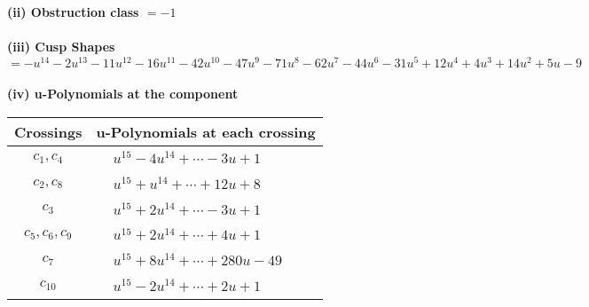 \documentclass[1p]{elsarticle_modified}
\theoremstyle{definition}
\begin{document}
\flushleft \textbf{(ii) Obstruction class $= -1$}\\~\\
\flushleft \textbf{(iii) Cusp Shapes $= - u^{14}-2 u^{13}-11 u^{12}-16 u^{11}-42 u^{10}-47 u^9-71 u^8-62 u^7-44 u^6-31 u^5+12 u^4+4 u^3+14 u^2+5 u-9$}\\~\\
\newpage\renewcommand{\arraystretch}{1}
\flushleft \textbf{(iv) u-Polynomials at the component}\newline \\
\begin{tabular}{m{50pt}|m{274pt}}
Crossings & \hspace{64pt}u-Polynomials at each crossing \\
\hline $$\begin{aligned}c_{1},c_{4}\end{aligned}$$&$\begin{aligned}
&u^{15}-4 u^{14}+\cdots-3 u+1
\end{aligned}$\\
\hline $$\begin{aligned}c_{2},c_{8}\end{aligned}$$&$\begin{aligned}
&u^{15}+u^{14}+\cdots+12 u+8
\end{aligned}$\\
\hline $$\begin{aligned}c_{3}\end{aligned}$$&$\begin{aligned}
&u^{15}+2 u^{14}+\cdots-3 u+1
\end{aligned}$\\
\hline $$\begin{aligned}c_{5},c_{6},c_{9}\end{aligned}$$&$\begin{aligned}
&u^{15}+2 u^{14}+\cdots+4 u+1
\end{aligned}$\\
\hline $$\begin{aligned}c_{7}\end{aligned}$$&$\begin{aligned}
&u^{15}+8 u^{14}+\cdots+280 u-49
\end{aligned}$\\
\hline $$\begin{aligned}c_{10}\end{aligned}$$&$\begin{aligned}
&u^{15}-2 u^{14}+\cdots+2 u+1
\end{aligned}$\\
\hline
\end{tabular}\\~\\
\end{document}
